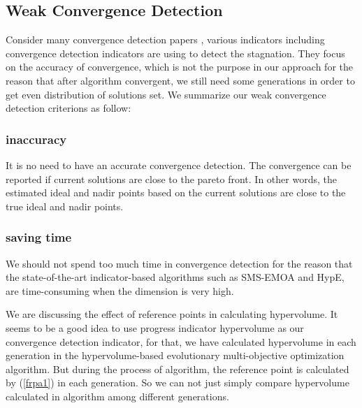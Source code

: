 \documentclass[conference]{IEEEtran}
\begin{document}
\subsection{Weak Convergence Detection}
Consider many convergence detection papers 
\cite{convergenceDetection:1, convergenceDetection:LSSC, convergenceDetection:OCD, 
convergenceDetection:OFCDandOCD, convergenceDetection:convergenceMetric, convergenceDetection:maxCD, 
convergenceDetection:online},
various indicators including convergence detection indicators are using to detect the stagnation.
They focus on the accuracy of convergence, which is not the purpose in our approach for 
the reason that after algorithm convergent, we still need some generations in order to
get even distribution of solutions set. 
We summarize our weak convergence detection criterions as follow:
\subsubsection{inaccuracy} It is no need to have an accurate convergence detection. 
The convergence can be reported if current solutions are close to the pareto front.
In other words, the estimated ideal and nadir points based on the current solutions
are close to the true ideal and nadir points. 
\subsubsection{saving time} We should not spend too much time in convergence detection
for the reason that the state-of-the-art indicator-based algorithms such as SMS-EMOA and HypE, 
are time-consuming when the dimension is very high. 

We are discussing the effect of reference points in calculating hypervolume. It seems to be a good
idea to use progress indicator hypervolume as our convergence detection indicator, 
for that, we have calculated 
hypervolume in each generation in the hypervolume-based evolutionary multi-objective optimization algorithm.
But during the process of algorithm, the reference point is calculated by (\ref{frpa1}) 
in each generation.
So we can not just simply compare hypervolume calculated in algorithm among different generations. 
\end{document}
